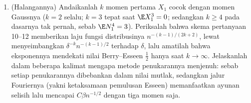 \begin{problem}
\begin{enumerate}[resume]
        \emph{(kini $\norm{\psi_\delta^{(4)}}_{L^1} =
        K_2\delta^{-3}$ dan $M_4 = K'\delta^{-4}$; pilihlah
        $\delta = n^{-1/4}$)}.
  \item (Halangannya) Andaikanlah $k$ momen pertama
        $X_1$ cocok dengan momen Gaussnya ($k = 2$ selalu;
        $k = 3$ tepat saat $\E X_1^3 = 0$; sedangkan $k \geq 4$
        pada dasarnya tak pernah, sebab $\E N_1^4 = 3$). Periksalah bahwa
        skema pertanyaan 10--12 memberikan
        laju fungsi distribusinya
        $n^{-(k-1)/(2k+2)}$, lewat menyeimbangkan
        $\delta^{-k}n^{-(k-1)/2}$ terhadap $\delta$, lalu
        amatilah bahwa eksponennya mendekati
        nilai Berry--Esseen $\frac12$ hanya saat $k \to
        \infty$. Jelaskanlah dalam beberapa kalimat mengapa
        metode penukarannya menjenuh: sebab setiap penukarannya dibebankan dalam
        nilai mutlak, sedangkan jalur Fouriernya
        (yakni ketaksamaan pemulusan Esseen) memanfaatkan
        ayunan selisih 
        lalu mencapai $C\beta n^{-1/2}$ dengan tiga
        momen saja.
\end{enumerate}


\end{problem}

